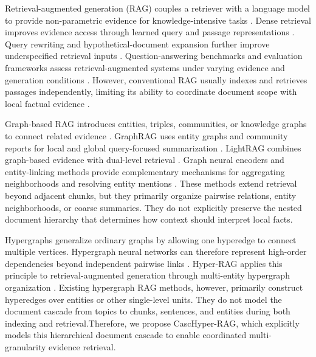 \documentclass{article} %
\begin{document}
Retrieval-augmented generation (RAG) couples a retriever with a language model to provide non-parametric evidence for knowledge-intensive tasks \citep{Lewis2020RAG,Guu2020REALM,Borgeaud2022RETRO,Asai2024SelfRAG,Gao2024RAGSurvey,Huang2026RAGSurvey}. Dense retrieval improves evidence access through learned query and passage representations \citep{Karpukhin2020DPR,Devlin2019BERT,Izacard2023Atlas}. Query rewriting and hypothetical-document expansion further improve underspecified retrieval inputs \citep{Ma2023QueryRewriting,Gao2023HyDE}. Question-answering benchmarks and evaluation frameworks assess retrieval-augmented systems under varying evidence and generation conditions \citep{Rajpurkar2016SQuAD,Kwiatkowski2019NaturalQuestions,Es2024RAGAS,Fabbri2021SummEval,Zheng2023LLMJudge}. However, conventional RAG usually indexes and retrieves passages independently, limiting its ability to coordinate document scope with local factual evidence \citep{Adjali2024MultiLevelRAG,Lan2023ComplexKBQA,Liu2024LostMiddle}.

Graph-based RAG introduces entities, triples, communities, or knowledge graphs to connect related evidence \citep{Pan2024LLMKG,Peng2025GraphRAGSurvey,Jin2024LLMGraphs,Zhong2023KGConstruction,Xu2024KGRAGCSQA}. GraphRAG uses entity graphs and community reports for local and global query-focused summarization \citep{Edge2025GraphRAG}. LightRAG combines graph-based evidence with dual-level retrieval \citep{Guo2025LightRAG}. Graph neural encoders and entity-linking methods provide complementary mechanisms for aggregating neighborhoods and resolving entity mentions \citep{Kipf2017GCN,Hamilton2017GraphSAGE,Velickovic2018GAT,Wu2021GNNSurvey,Hoffart2011AIDA,Sevgili2022EntityLinkingSurvey,Yamada2020LUKE}. These methods extend retrieval beyond adjacent chunks, but they primarily organize pairwise relations, entity neighborhoods, or coarse summaries. They do not explicitly preserve the nested document hierarchy that determines how context should interpret local facts.

Hypergraphs generalize ordinary graphs by allowing one hyperedge to connect multiple vertices. Hypergraph neural networks can therefore represent high-order dependencies beyond independent pairwise links \citep{Feng2019HGNN,Gao2023HGNNPlus,Chien2022AllSet}. Hyper-RAG applies this principle to retrieval-augmented generation through multi-entity hypergraph organization \citep{Feng2026HyperRAG}. Existing hypergraph RAG methods, however, primarily construct hyperedges over entities or other single-level units. They do not model the document cascade from topics to chunks, sentences, and entities during both indexing and retrieval.Therefore, we propose CascHyper-RAG, which explicitly models this hierarchical document cascade to enable coordinated multi-granularity evidence retrieval.
\end{document}
